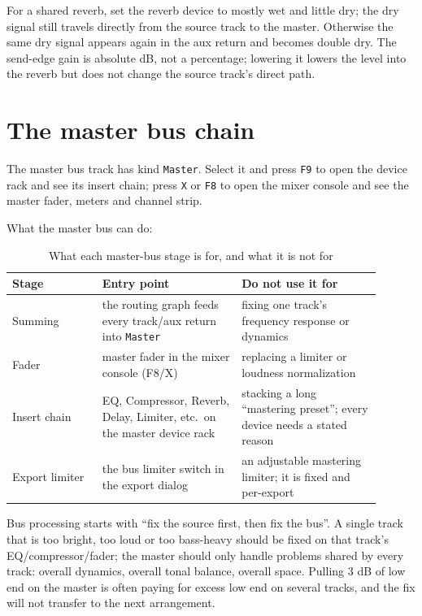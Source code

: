 For a shared reverb, set the reverb device to mostly wet and little dry; the dry signal still travels directly from the source track to the master. Otherwise the same dry signal appears again in the aux return and becomes double dry. The send-edge gain is absolute dB, not a percentage; lowering it lowers the level into the reverb but does not change the source track's direct path.

\section{The master bus chain}

The master bus track has kind \texttt{Master}. Select it and press \texttt{F9} to open the device rack and see its insert chain; press \texttt{X} or \texttt{F8} to open the mixer console and see the master fader, meters and channel strip.

What the master bus can do:

\begin{table}[htbp]
\centering
\small
\begin{tabular}{@{}p{0.22\linewidth}p{0.34\linewidth}p{0.34\linewidth}@{}}
\hline
Stage & Entry point & Do not use it for \\
\hline
Summing & the routing graph feeds every track/aux return into \texttt{Master} & fixing one track's frequency response or dynamics \\
Fader & master fader in the mixer console (F8/X) & replacing a limiter or loudness normalization \\
Insert chain & EQ, Compressor, Reverb, Delay, Limiter, etc.\ on the master device rack & stacking a long ``mastering preset''; every device needs a stated reason \\
Export limiter & the bus limiter switch in the export dialog & an adjustable mastering limiter; it is fixed and per-export \\
\hline
\end{tabular}
\caption{What each master-bus stage is for, and what it is not for}
\label{tab:master-stages}
\end{table}


Bus processing starts with ``fix the source first, then fix the bus''. A single track that is too bright, too loud or too bass-heavy should be fixed on that track's EQ/compressor/fader; the master should only handle problems shared by every track: overall dynamics, overall tonal balance, overall space. Pulling 3 dB of low end on the master is often paying for excess low end on several tracks, and the fix will not transfer to the next arrangement.

